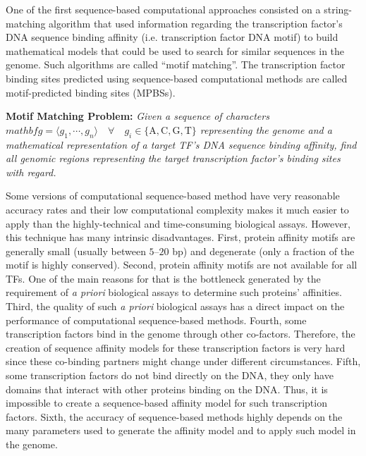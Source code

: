 One of the first sequence-based computational approaches consisted on a string-matching algorithm that used information regarding the transcription factor's DNA sequence binding affinity (i.e. transcription factor DNA motif) to build mathematical models that could be used to search for similar sequences in the genome. Such algorithms are called ``motif matching''. The transcription factor binding sites predicted using sequence-based computational methods are called motif-predicted binding sites (MPBSs).

\vspace{0.5cm}
\noindent
\textbf{Motif Matching Problem:} \emph{Given a sequence of characters $mathbf{g} = \langle g_1, \cdots, g_n \rangle \quad \forall \quad g_i \in \{\text{A}, \text{C}, \text{G}, \text{T}\}$ representing the genome and a mathematical representation of a target TF's DNA sequence binding affinity, find all genomic regions representing the target transcription factor's binding sites with regard.}
\vspace{0.45cm}

Some versions of computational sequence-based method have very reasonable accuracy rates and their low computational complexity makes it much easier to apply than the highly-technical and time-consuming biological assays. However, this technique has many intrinsic disadvantages. First, protein affinity motifs are generally small (usually between $5$--$20$ bp) and degenerate (only a fraction of the motif is highly conserved). Second, protein affinity motifs are not available for all TFs. One of the main reasons for that is the bottleneck generated by the requirement of \emph{a priori} biological assays to determine such proteins' affinities. Third, the quality of such \emph{a priori} biological assays has a direct impact on the performance of computational sequence-based methods. Fourth, some transcription factors bind in the genome through other co-factors. Therefore, the creation of sequence affinity models for these transcription factors is very hard since these co-binding partners might change under different circumstances. Fifth, some transcription factors do not bind directly on the DNA, they only have domains that interact with other proteins binding on the DNA. Thus, it is impossible to create a sequence-based affinity model for such transcription factors. Sixth, the accuracy of sequence-based methods highly depends on the many parameters used to generate the affinity model and to apply such model in the genome.

